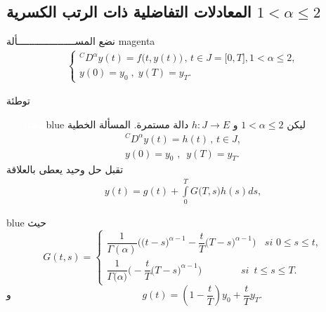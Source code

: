 \documentclass[dvipsnames,mathserif]{beamer}
\begin{document}
\subsection{ المعادلات التفاضلية ذات الرتب الكسرية $1<\alpha \le 2$ }
\begin{frame}
\begin{ambox}{نضع المســــــــــــــــــــألة }{magenta}
\begin{align}
\begin{cases}
{}^C{D^\alpha }y(t) = f\big(t,y(t)\big)\,,\,t \in J = \big[ {0,T} \big],1 < \alpha  \le 2 ,\\
y(0) = y_{0}\;,\;y(T) = y_{T}.
\end{cases}
\end{align}
\end{ambox}
\end{frame}
\begin{frame}{توطئة}
\begin{box2}{\textcolor{white}{توطئة 3.2}}{blue}
{\LARGE{}}
ليكن
$1 < \alpha  \le 2$
و
$h:J \to E$
دالة مستمرة.
المسألة الخطية
\begin{align*}
{}^CD^{\alpha }y(t) = h(t)\,,\,t \in J ,\\
y(0) = y_{0}\,\,,\,\,\,y(T) = y_{T}.
\end{align*}
تقبل حل وحيد يعطى بالعلاقة 
\begin{align*}
y(t) = g(t) + \int\limits_0^T {G\big(T,s\big)} h(s)ds,
\end{align*}
\end{box2}
\end{frame}
\begin{frame}
\begin{box2}{}{blue}
حيث
$$G(t,s) = \begin{cases}\dfrac{1}{{\Gamma (\alpha )}} 
\bigg(\big(t - s\big)^{\alpha  - 1} - \dfrac{t}{T}{\big(T - s\big)^{\alpha  - 1}}\bigg)\,\,\;\;si\,\,0 \le s \le t ,\\
 \dfrac{1}{{\Gamma \big(\alpha \big)}}\bigg(- \dfrac{t}{T}{\big(T - s\big)^{\alpha  - 1}}\bigg)\,\,\,\,\,\,\,\,\,\,\,\,\,\,\,\,\,\,\,\;\;\;si\,\,\,t \le s \le T.
\end{cases}$$
و~~~~~~~~~~~~~~~~~~~~~~~~~~
$g(t) = \left( {1 - \dfrac{t}{T}} \right){y_0} + \dfrac{t}{T}{y_T}.$
\end{box2}
\end{frame}
\end{document}
